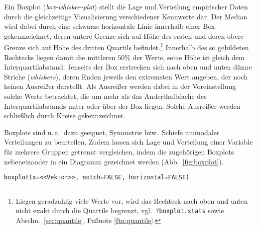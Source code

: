 Ein Boxplot (\emph{box-whisker-plot}) stellt die Lage und Verteilung empirischer Daten durch die gleichzeitige Visualisierung verschiedener Kennwerte dar. Der Median wird dabei durch eine schwarze horizontale Linie innerhalb einer Box gekennzeichnet, deren untere Grenze sich auf Höhe des ersten und deren obere Grenze sich auf Höhe des dritten Quartils befindet.\footnote{Liegen geradzahlig viele Werte vor, wird das Rechteck nach oben und unten nicht exakt durch die Quartile begrenzt, vgl.\ \lstinline!?boxplot.stats! sowie Abschn.\ \ref{sec:quantile}, Fußnote \ref{ftn:quantile}.} Innerhalb des so gebildeten Rechtecks liegen damit die mittleren $50\%$ der Werte, seine Höhe ist gleich dem Interquartilabstand. Jenseits der Box erstrecken sich nach oben und unten dünne Striche (\emph{whiskers}), deren Enden jeweils den extremsten Wert angeben, der noch keinen Ausreißer darstellt. Als Ausreißer werden dabei in der Voreinstellung solche Werte betrachtet, die um mehr als das Anderthalbfache des Interquartilabstands unter oder über der Box liegen. Solche Ausreißer werden schließlich durch Kreise gekennzeichnet.

Boxplots sind u.\,a.\ dazu geeignet, Symmetrie bzw.\ Schiefe unimodaler Verteilungen zu beurteilen. Zudem lassen sich Lage und Verteilung einer Variable für mehrere Gruppen getrennt vergleichen, indem die zugehörigen Boxplots nebeneinander in ein Diagramm gezeichnet werden (Abb.\ \ref{fig:boxplot}).
\begin{lstlisting}
boxplot(x=<<Vektor>>, notch=FALSE, horizontal=FALSE)
\end{lstlisting}

